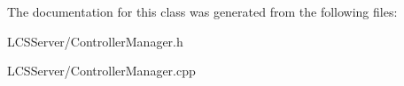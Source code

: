 The documentation for this class was generated from the following files\+:\begin{DoxyCompactItemize}
\item 
L\+C\+S\+Server/Controller\+Manager.\+h\item 
L\+C\+S\+Server/Controller\+Manager.\+cpp\end{DoxyCompactItemize}
